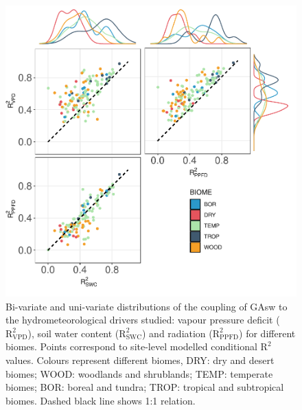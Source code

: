 \documentclass[11pt,twoside]{reedthesis}
\begin{document}
\begin{figure}[hbt!]

{\centering \includegraphics[width=1\linewidth]{figure/CH4/Figure1} 

}

\caption[Bi-variate and uni-variate distributions of the coupling of GAsw to the hydrometeorological drivers.]{Bi-variate and uni-variate distributions of the coupling of GAsw to the hydrometeorological drivers studied: vapour pressure deficit ($\text{R}^2_{\text{VPD}}$), soil water content ($\text{R}^2_{\text{SWC}}$) and radiation ($\text{R}^2_{\text{PPFD}}$) for different biomes. Points correspond to site-level modelled conditional $\text{R}^2$ values. Colours represent different biomes, DRY: dry and desert biomes; WOOD: woodlands and shrublands; TEMP: temperate biomes; BOR: boreal and tundra; TROP: tropical and subtropical biomes. Dashed black line shows 1:1 relation.}\label{fig:ch4fig1}
\end{figure}
\end{document}
